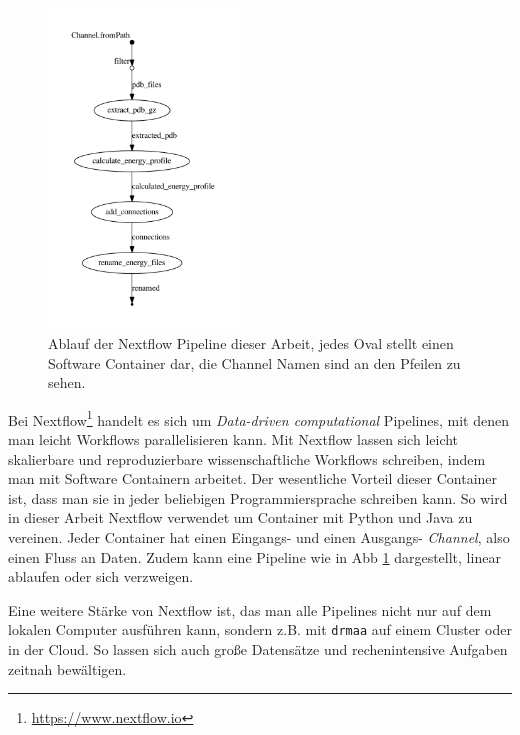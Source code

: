 \begin{figure}
\centering
\includegraphics[width=0.45\textwidth]{images/flowchart.pdf}
\caption{Ablauf der Nextflow Pipeline dieser Arbeit, jedes Oval stellt einen Software Container dar, die Channel Namen sind an den Pfeilen zu sehen.}
\label{fig:nextflow_pipe}
\end{figure}
Bei Nextflow\footnote{\url{https://www.nextflow.io}} handelt es sich um \emph{Data-driven computational} Pipelines, mit denen man leicht Workflows parallelisieren kann. Mit Nextflow lassen sich leicht skalierbare und reproduzierbare wissenschaftliche Workflows schreiben, indem man mit Software Containern arbeitet. Der wesentliche Vorteil dieser Container ist, dass man sie in jeder beliebigen Programmiersprache schreiben kann. So wird in dieser Arbeit Nextflow verwendet um Container mit Python und Java zu vereinen. Jeder Container hat einen Eingangs- und einen Ausgangs- \emph{Channel}, also einen Fluss an Daten. Zudem kann eine Pipeline wie in \ac{Abb} \ref{fig:nextflow_pipe} dargestellt, linear ablaufen oder sich verzweigen.

Eine weitere Stärke von Nextflow ist, das man alle Pipelines nicht nur auf dem lokalen Computer ausführen kann, sondern z.B. mit \texttt{drmaa} auf einem Cluster oder in der Cloud. So lassen sich auch große Datensätze und rechenintensive Aufgaben zeitnah bewältigen.






